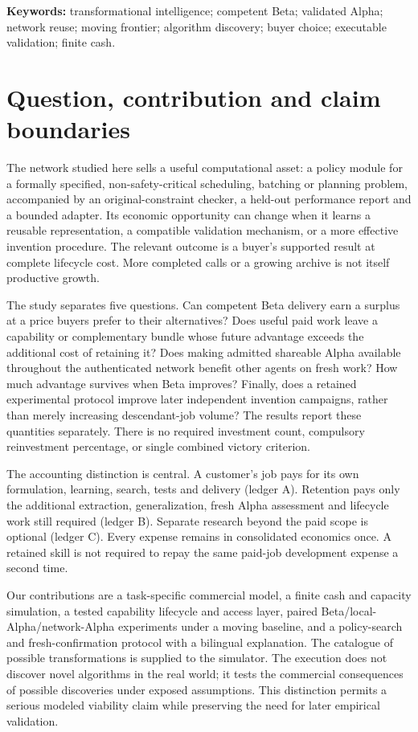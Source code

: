 \documentclass[11pt,a4paper]{article}
\begin{document}
\textbf{Keywords:} transformational intelligence; competent Beta; validated Alpha; network reuse; moving frontier; algorithm discovery; buyer choice; executable validation; finite cash.

\section{Question, contribution and claim boundaries}

The network studied here sells a useful computational asset: a policy module for a formally specified, non-safety-critical scheduling, batching or planning problem, accompanied by an original-constraint checker, a held-out performance report and a bounded adapter. Its economic opportunity can change when it learns a reusable representation, a compatible validation mechanism, or a more effective invention procedure. The relevant outcome is a buyer's supported result at complete lifecycle cost. More completed calls or a growing archive is not itself productive growth.

The study separates five questions. Can competent Beta delivery earn a surplus at a price buyers prefer to their alternatives? Does useful paid work leave a capability or complementary bundle whose future advantage exceeds the additional cost of retaining it? Does making admitted shareable Alpha available throughout the authenticated network benefit other agents on fresh work? How much advantage survives when Beta improves? Finally, does a retained experimental protocol improve later independent invention campaigns, rather than merely increasing descendant-job volume? The results report these quantities separately. There is no required investment count, compulsory reinvestment percentage, or single combined victory criterion.

The accounting distinction is central. A customer's job pays for its own formulation, learning, search, tests and delivery (ledger A). Retention pays only the additional extraction, generalization, fresh Alpha assessment and lifecycle work still required (ledger B). Separate research beyond the paid scope is optional (ledger C). Every expense remains in consolidated economics once. A retained skill is not required to repay the same paid-job development expense a second time.

Our contributions are a task-specific commercial model, a finite cash and capacity simulation, a tested capability lifecycle and access layer, paired Beta/local-Alpha/network-Alpha experiments under a moving baseline, and a policy-search and fresh-confirmation protocol with a bilingual explanation. The catalogue of possible transformations is supplied to the simulator. The execution does not discover novel algorithms in the real world; it tests the commercial consequences of possible discoveries under exposed assumptions. This distinction permits a serious modeled viability claim while preserving the need for later empirical validation.
\end{document}
